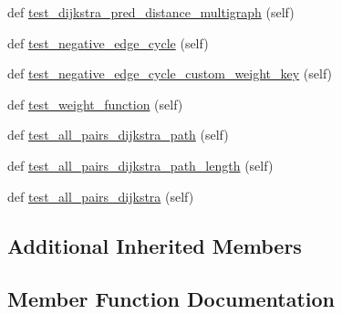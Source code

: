 \begin{DoxyCompactItemize}
\item 
def \hyperlink{classnetworkx_1_1algorithms_1_1shortest__paths_1_1tests_1_1test__weighted_1_1TestWeightedPath_a0e50319a721dfe1613b00b677c3d2f84}{test\+\_\+dijkstra\+\_\+pred\+\_\+distance\+\_\+multigraph} (self)
\item 
def \hyperlink{classnetworkx_1_1algorithms_1_1shortest__paths_1_1tests_1_1test__weighted_1_1TestWeightedPath_a8b91827e5b84ff78f22d26ed5248b675}{test\+\_\+negative\+\_\+edge\+\_\+cycle} (self)
\item 
def \hyperlink{classnetworkx_1_1algorithms_1_1shortest__paths_1_1tests_1_1test__weighted_1_1TestWeightedPath_a1f97e4dc44f8a54ea4717d9b78db832e}{test\+\_\+negative\+\_\+edge\+\_\+cycle\+\_\+custom\+\_\+weight\+\_\+key} (self)
\item 
def \hyperlink{classnetworkx_1_1algorithms_1_1shortest__paths_1_1tests_1_1test__weighted_1_1TestWeightedPath_acefb348c923c3144a873aac86ae8748c}{test\+\_\+weight\+\_\+function} (self)
\item 
def \hyperlink{classnetworkx_1_1algorithms_1_1shortest__paths_1_1tests_1_1test__weighted_1_1TestWeightedPath_ad5747291753a8c39a7212edc0e5591f7}{test\+\_\+all\+\_\+pairs\+\_\+dijkstra\+\_\+path} (self)
\item 
def \hyperlink{classnetworkx_1_1algorithms_1_1shortest__paths_1_1tests_1_1test__weighted_1_1TestWeightedPath_a03f37075ec6d65f008ce2f5b03e7a60a}{test\+\_\+all\+\_\+pairs\+\_\+dijkstra\+\_\+path\+\_\+length} (self)
\item 
def \hyperlink{classnetworkx_1_1algorithms_1_1shortest__paths_1_1tests_1_1test__weighted_1_1TestWeightedPath_a7769836e4a4a99900b3b2ca339a4b604}{test\+\_\+all\+\_\+pairs\+\_\+dijkstra} (self)
\end{DoxyCompactItemize}
\subsection*{Additional Inherited Members}


\subsection{Member Function Documentation}
\mbox{\label{classnetworkx_1_1algorithms_1_1shortest__paths_1_1tests_1_1test__weighted_1_1TestWeightedPath_ab102d1848f9f27114c6e8bae6220f6bc}} 
